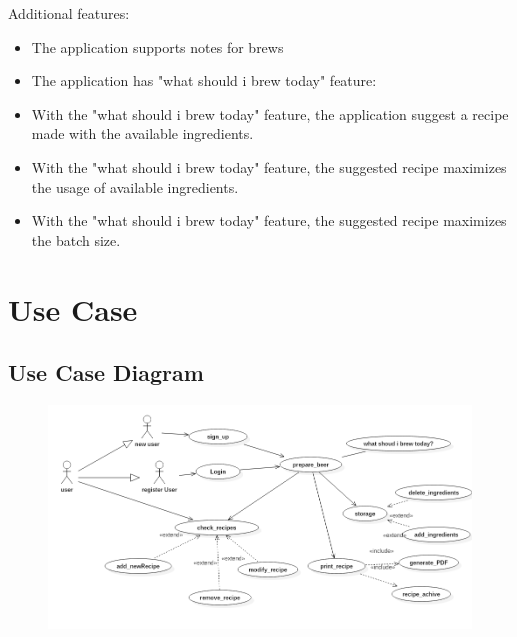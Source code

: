\documentclass[12pt]{article}
\begin{document}
Additional features:
\begin{itemize}
\item The application supports notes for brews

\item The application has "what should i brew today" feature:

\item With the "what should i brew today" feature, the application suggest a recipe made with the available ingredients.

\item With the "what should i brew today" feature, the suggested recipe maximizes the usage of available ingredients.

\item With the "what should i brew today" feature, the suggested recipe maximizes the batch size.
\end{itemize}

\section{Use Case}
\subsection{Use Case Diagram}
\begin{figure}[H]
\includegraphics[scale=0.8]{UseCaseDiagram.png}
\centering
\end{figure}
\end{document}

